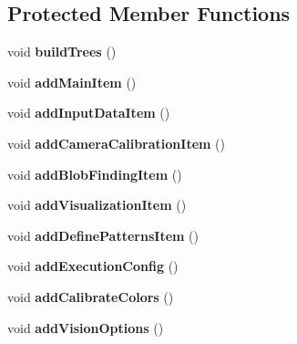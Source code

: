 \subsection*{Protected Member Functions}
\begin{DoxyCompactItemize}
\item 
void {\bfseries build\+Trees} ()\hypertarget{classMainWindow_a904aeccdff7a61af31954793944ef364}{}\label{classMainWindow_a904aeccdff7a61af31954793944ef364}

\item 
void {\bfseries add\+Main\+Item} ()\hypertarget{classMainWindow_a7f3e055a4f80071b7265cc32d10b1a29}{}\label{classMainWindow_a7f3e055a4f80071b7265cc32d10b1a29}

\item 
void {\bfseries add\+Input\+Data\+Item} ()\hypertarget{classMainWindow_aa2cc5fc73f649129465c371368185189}{}\label{classMainWindow_aa2cc5fc73f649129465c371368185189}

\item 
void {\bfseries add\+Camera\+Calibration\+Item} ()\hypertarget{classMainWindow_ae887769c9a6614f6827afdb74ab9cd12}{}\label{classMainWindow_ae887769c9a6614f6827afdb74ab9cd12}

\item 
void {\bfseries add\+Blob\+Finding\+Item} ()\hypertarget{classMainWindow_a659cf521c8e7053eaba4971293050883}{}\label{classMainWindow_a659cf521c8e7053eaba4971293050883}

\item 
void {\bfseries add\+Visualization\+Item} ()\hypertarget{classMainWindow_aa30ad88d5b5acbf1cc9f70840d416e24}{}\label{classMainWindow_aa30ad88d5b5acbf1cc9f70840d416e24}

\item 
void {\bfseries add\+Define\+Patterns\+Item} ()\hypertarget{classMainWindow_a9f08218f96f231b1615ce24d933b15ce}{}\label{classMainWindow_a9f08218f96f231b1615ce24d933b15ce}

\item 
void {\bfseries add\+Execution\+Config} ()\hypertarget{classMainWindow_a4d645b048c765c34481cb4e7749af6cf}{}\label{classMainWindow_a4d645b048c765c34481cb4e7749af6cf}

\item 
void {\bfseries add\+Calibrate\+Colors} ()\hypertarget{classMainWindow_a5fa2d31a87dcc532276b17ab49712add}{}\label{classMainWindow_a5fa2d31a87dcc532276b17ab49712add}

\item 
void {\bfseries add\+Vision\+Options} ()\hypertarget{classMainWindow_a84f4504e9262385ede0b0e89832181f9}{}\label{classMainWindow_a84f4504e9262385ede0b0e89832181f9}


\end{DoxyCompactItemize}
